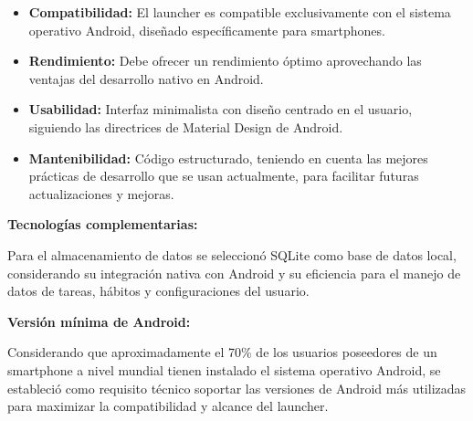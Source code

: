 \begin{itemize}
    \item \textbf{Compatibilidad:} El launcher es compatible exclusivamente con el sistema operativo Android, diseñado específicamente para smartphones.
    
    \item \textbf{Rendimiento:} Debe ofrecer un rendimiento óptimo aprovechando las ventajas del desarrollo nativo en Android.
    
    \item \textbf{Usabilidad:} Interfaz minimalista con diseño centrado en el usuario, siguiendo las directrices de Material Design de Android.
    
    \item \textbf{Mantenibilidad:} Código estructurado, teniendo en cuenta las mejores prácticas de desarrollo que se usan actualmente, para facilitar futuras actualizaciones y mejoras.
\end{itemize}

\textbf{Tecnologías complementarias:}

Para el almacenamiento de datos se seleccionó SQLite como base de datos local, considerando su integración nativa con Android y su eficiencia para el manejo de datos de tareas, hábitos y configuraciones del usuario.

\textbf{Versión mínima de Android:}

Considerando que aproximadamente el 70\% de los usuarios poseedores de un smartphone a nivel mundial tienen instalado el sistema operativo Android, se estableció como requisito técnico soportar las versiones de Android más utilizadas para maximizar la compatibilidad y alcance del launcher.